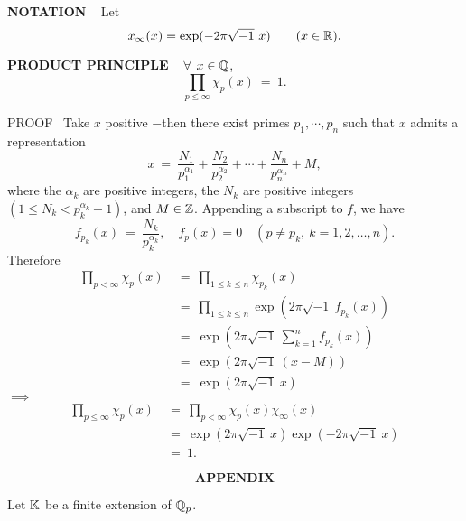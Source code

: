 \vspace{0.1cm}


\begin{x}{\small\bf NOTATION} \ %
Let
\[
x_\infty(x) = \exp(-2\pi \sqrt{-1} \  x) \qquad (x \in \mathbb{R}).
\]
\end{x}

\vspace{0.1cm}

\begin{x}{\small\bf PRODUCT PRINCIPLE} \ %
$\forall$ $x \in \mathbb{Q}$,
\[
\prod_{p \le \infty} \chi_p(x) \ = \ 1.
\]

\vspace{0.1cm}

PROOF \  Take $x$ positive $-$then there exist primes $p_1, \cdots, p_n$ such that $x$ admits a representation
\[
x \ = \ 
\frac{N_1}{p_1^{\alpha_1}} + 
\frac{N_2}{p_2^{\alpha_2}} + \cdots + 
\frac{N_n}{p_n^{\alpha_n}} + M,
\]
where the $\alpha_k$ are positive integers, the $N_k$ are positive integers 
$(1 \le N_k < p_k^{\alpha_k} - 1)$, and $M \in \mathbb{Z}$.  
Appending a subscript to $f$, we have
\[
f_{p_k}(x) \ = \ 
\frac{N_k}{p_k^{\alpha_k}}, \quad f_p(x) = 0 \quad (p \ne p_k, \ k = 1, 2, \ldots, n).
\]
Therefore
\begin{align*}
\prod_{p < \infty} \chi_p(x) \ 	
&= \  \prod_{1 \le k \le n} \chi_{p_k}(x)\\	
&= \  \prod_{1 \le k \le n} \exp(2\pi\sqrt{-1}\ 	 f_{p_k}(x))\\
&= \  \exp(2\pi\sqrt{-1}\ 	 \sum_{k = 1}^n f_{p_k}(x))\\
&= \  \exp(2\pi\sqrt{-1}\ 	 (x - M))\\
&= \  \exp(2\pi\sqrt{-1}\ 	 x)
\end{align*}
\qquad\qquad$\implies$
\begin{align*}
\prod_{p \le \infty} \chi_p(x) \ 	
&=\ \prod_{p < \infty} \chi_p(x) \chi_\infty (x) \\	
&=\ \exp(2\pi\sqrt{-1}\ 	 x) \exp(-2\pi\sqrt{-1}\ 	 x)\\							
&=\ 1.
\end{align*}
\end{x}

\vspace{0.1cm}

\[
\textbf{APPENDIX}
\]
\setcounter{theoremn}{0}

Let $\mathbb{K}$ be a finite extension of $\mathbb{Q}_p$.
\vspace{0.25cm}

